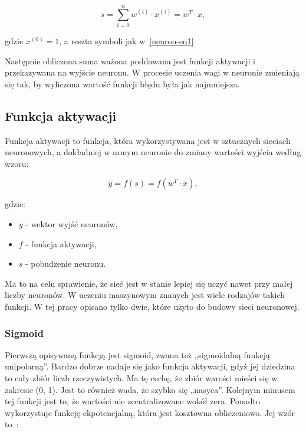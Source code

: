     \begin{equation}
        s = \sum _{i=0}^{n} {w^{(i)} \cdot x^{(i)}} = w^T \cdot x,
        \label{neuron-eq2}
    \end{equation}

    gdzie $x^{(0)} = 1$, a reszta symboli jak w~\ref{neuron-eq1}.

    Następnie obliczona suma ważona poddawana jest funkcji aktywacji i przekazywana na wyjście neuronu.
    W procesie uczenia wagi w neuronie zmieniają się tak, by wyliczona wartość funkcji błędu była jak najmniejsza.

    \subsection{Funkcja aktywacji}\label{subsec:funkcjaAktywacji}

    Funkcja aktywacji to funkcja, która wykorzystywana jest w sztucznych sieciach neuronowych, a dokładniej w samym neuronie do zmiany wartości wyjścia według wzoru:

    \begin{equation}
        y = f(s) = f(w^T \cdot x),
    \end{equation}

    gdzie:
    \begin{itemize}
        \item $y$ - wektor wyjść neuronów,
        \item $f$ - funkcja aktywacji,
        \item $s$ - pobudzenie neuronu.
    \end{itemize}

    Ma to na celu sprawienie, że sieć jest w stanie lepiej się uczyć nawet przy małej liczby neuronów.
    W uczeniu maszynowym znanych jest wiele rodzajów takich funkcji.
    W tej pracy opisano tylko dwie, które użyto do budowy sieci neuronowej.

    \subsubsection{Sigmoid}

    Pierwszą opisywaną funkcją jest sigmoid, zwana też „sigmoidalną funkcją unipolarną”.
    Bardzo dobrze nadaje się jako funkcja aktywacji, gdyż jej dziedzina to cały zbiór liczb rzeczywistych.
    Ma tę cechę, że zbiór warości mieści się w zakresie (0, 1).
    Jest to również wada, że szybko się „nasyca”.
    Kolejnym minusem tej funkcji jest to, że wartości nie zcentralizowane wokół zera.
    Ponadto wykorzystuje funkcję ekpotencjalną, która jest kosztowna obliczeniowo.
    Jej wzór to~\cite{sigmoid}:

